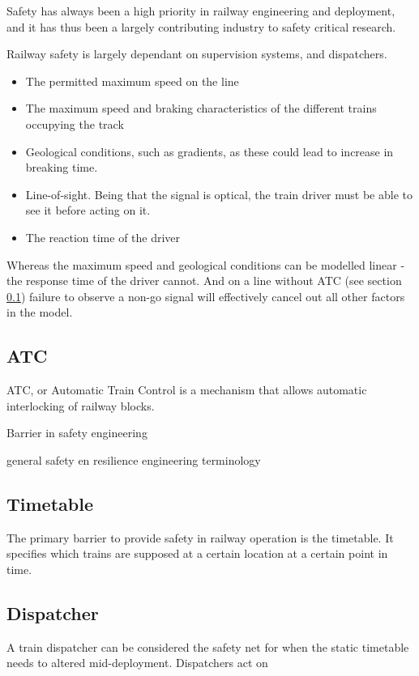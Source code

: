 Safety has always been a high priority in railway engineering and deployment, and it has thus been a largely contributing industry to safety critical research.

Railway safety is largely dependant on supervision systems, and dispatchers.

\begin{itemize}
  \item The permitted maximum speed on the line
  \item The maximum speed and braking characteristics of the different trains occupying the track
  \item Geological conditions, such as gradients, as these could lead to increase in breaking time.
  \item Line-of-sight. Being that the signal is optical, the train driver must be able to see it before acting on it.
  \item The reaction time of the driver
\end{itemize}
Whereas the maximum speed and geological conditions can be modelled linear - the response time of the driver cannot. And on a line without ATC (see section \ref{sec:atc}) failure to observe a non-go signal will effectively cancel out all other factors in the model.

\subsection{ATC}
\label{sec:atc}
ATC, or Automatic Train Control is a mechanism that allows automatic interlocking of railway blocks.

Barrier in safety engineering

general safety en resilience engineering terminology




\subsection{Timetable}
The primary barrier to provide safety in railway operation is the timetable. It specifies which trains are supposed at a certain location at a certain point in time.

\subsection{Dispatcher}
A train dispatcher can be considered the safety net for when the static timetable needs to altered mid-deployment.
Dispatchers act on



